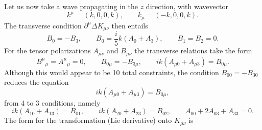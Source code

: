 \documentclass[10pt,letterpaper]{article}
\numberwithin{equation}{subsection}
\begin{document}
Let us now take a wave propagating in the $z$ direction, with wavevector
\begin{equation}
k^\mu = (k,0,0,k),\qquad k_\mu = (-k,0,0,k).
\end{equation}
The transverse condition $\partial^\mu \Delta K_{\mu\nu}$ then entails
\begin{equation}
B_0 = -B_3,\qquad B_0 = \frac{i}{5}k(A_0+A_3),\qquad B_1 = B_2 = 0.
\end{equation}
For the tensor polarizations $A_{\mu\nu}$ and $B_{\mu\nu}$ the transverse relations take the form
\begin{equation}
B^\mu{}_\mu = A^\mu{}_\mu = 0,\qquad B_{0\mu} = -B_{3\mu},\qquad ik(A_{\mu 0}+ A_{\mu 3}) = B_{0\mu}.
\end{equation}
Although this would appear to be 10 total constraints, the condition $B_{00} = -B_{30}$ reduces the equation
\begin{equation}
ik(A_{\mu0}+A_{\mu 3}) = B_{0\mu},
\end{equation}
from 4 to 3 conditions, namely
\begin{equation}
ik(A_{10}+A_{13}) = B_{01},\qquad ik(A_{20}+A_{23}) = B_{02},\qquad A_{00} + 2A_{03} + A_{33} = 0.
\end{equation}
The form for the transformation (Lie derivative) onto $K_{\mu\nu}$ is
\end{document}
